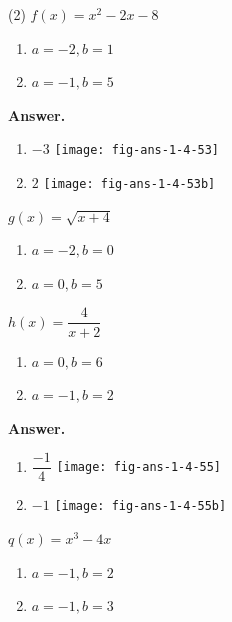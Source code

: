 \documentclass[10pt,]{book}
\theoremstyle{plain}
\theoremstyle{definition}
\theoremstyle{definition}
\theoremstyle{definition}
\theoremstyle{definition}
\numberwithin{equation}{part}
\begin{document}
\begin{exercisegroup}(2)
\exercise[53.]\hypertarget{exercise-268}{}\(f (x) = x^2 - 2x - 8\) \leavevmode%
\begin{enumerate}[label=*\alph**]
\item\hypertarget{li-1060}{}\(a=-2, b = 1\)%
\item\hypertarget{li-1061}{}\(a=-1, b = 5\)%
\end{enumerate}
%
\par\smallskip
\noindent\textbf{Answer.}\hypertarget{answer-152}{}\quad
\leavevmode%
\begin{enumerate}[label=*\alph**]
\item\hypertarget{li-1062}{}\(-3\) \texttt{[image: fig-ans-1-4-53]}
%
\item\hypertarget{li-1063}{}\(2\) \texttt{[image: fig-ans-1-4-53b]}
%
\end{enumerate}
%
\exercise[54.]\hypertarget{exercise-269}{}\(g(x) = \sqrt{x+4} \) \leavevmode%
\begin{enumerate}[label=*\alph**]
\item\hypertarget{li-1064}{}\(a=-2, b = 0\)%
\item\hypertarget{li-1065}{}\(a = 0, b = 5\)%
\end{enumerate}
%
\exercise[55.]\hypertarget{exercise-270}{}\(h (x) =\dfrac{4}{x+2} \) \leavevmode%
\begin{enumerate}[label=*\alph**]
\item\hypertarget{li-1066}{}\(a = 0, b = 6\)%
\item\hypertarget{li-1067}{}\(a=-1, b = 2\)%
\end{enumerate}
%
\par\smallskip
\noindent\textbf{Answer.}\hypertarget{answer-153}{}\quad
\leavevmode%
\begin{enumerate}[label=*\alph**]
\item\hypertarget{li-1068}{}\(\dfrac{-1}{4} \) \texttt{[image: fig-ans-1-4-55]}
%
\item\hypertarget{li-1069}{}\(-1\) \texttt{[image: fig-ans-1-4-55b]}
%
\end{enumerate}
%
\exercise[56.]\hypertarget{exercise-271}{}\(q(x) = x^3 - 4x \) \leavevmode%
\begin{enumerate}[label=*\alph**]
\item\hypertarget{li-1070}{}\(a=-1, b = 2\)%
\item\hypertarget{li-1071}{}\(a=-1, b = 3\)%
\end{enumerate}
%
\end{exercisegroup}
\end{document}
